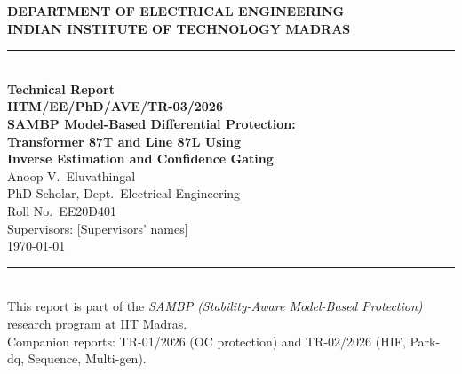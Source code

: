 \documentclass[12pt,a4paper]{article}
\begin{document}

\begin{titlepage}
  \begin{center}
    \vspace*{1.5cm}
    {\large \textbf{DEPARTMENT OF ELECTRICAL ENGINEERING}}\\[0.3cm]
    {\large \textbf{INDIAN INSTITUTE OF TECHNOLOGY MADRAS}}\\[0.3cm]
    \rule{\linewidth}{1pt}\\[0.6cm]

    {\LARGE \textbf{Technical Report}}\\[0.4cm]
    {\Large \textbf{IITM/EE/PhD/AVE/TR-03/2026}}\\[1.5cm]

    {\huge \bfseries
     SAMBP Model-Based Differential Protection:\\[0.3cm]
     Transformer 87T and Line 87L Using\\[0.3cm]
     Inverse Estimation and Confidence Gating}\\[1.5cm]

    {\large Anoop V.\ Eluvathingal}\\[0.2cm]
    {\normalsize PhD Scholar, Dept.\ Electrical Engineering}\\[0.1cm]
    {\normalsize Roll No.\ EE20D401}\\[1.0cm]

    {\normalsize Supervisors: [Supervisors' names]}\\[0.2cm]
    {\normalsize \today}\\[1.0cm]

    \rule{\linewidth}{1pt}\\[0.4cm]
    {\small This report is part of the
    \emph{SAMBP (Stability-Aware Model-Based Protection)}
    research program at IIT Madras.\\
    Companion reports: TR-01/2026 (OC protection) and TR-02/2026
    (HIF, Park-dq, Sequence, Multi-gen).}
  \end{center}
\end{titlepage}
\end{document}
